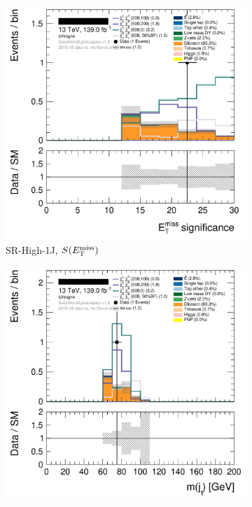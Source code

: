 \begin{figure}[tp]
\centering
\begin{subfigure}{0.495\textwidth}
\centering
\includegraphics[width=\textwidth]{figures/2ljets_def_met_Sign_SRHigh4.png}
\caption{SR-High-1J, $S(E_\mathrm{T}^\mathrm{miss})$}
\end{subfigure}
\hfill
\begin{subfigure}{0.495\textwidth}
\centering
\includegraphics[width=\textwidth]{figures/2ljets_def_mjetone_SRHigh4.png}

\end{subfigure}
\end{figure}
